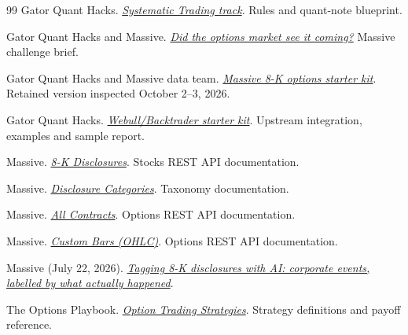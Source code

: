 \documentclass[11pt,letterpaper]{article}
\begin{document}
\clearpage
\begin{thebibliography}{99}
Gator Quant Hacks.
\href{https://www.gqhacks.com/tracks/systematic-trading}
{\emph{Systematic Trading track}}. Rules and quant-note blueprint.

Gator Quant Hacks and Massive.
\href{https://www.gqhacks.com/tracks/systematic-trading/massive}
{\emph{Did the options market see it coming?}} Massive challenge brief.

Gator Quant Hacks and Massive data team.
\href{https://www.gqhacks.com/massive/gqh-massive-8k-starter-kit.zip}
{\emph{Massive 8-K options starter kit}}.
Retained version inspected October 2--3, 2026.

Gator Quant Hacks.
\href{https://www.gqhacks.com/webull/gqh-webull-backtrader-starter.zip}
{\emph{Webull/Backtrader starter kit}}.
Upstream integration, examples and sample report.

Massive.
\href{https://massive.com/docs/rest/stocks/filings/8-k-disclosures}
{\emph{8-K Disclosures}}. Stocks REST API documentation.

Massive.
\href{https://massive.com/docs/rest/stocks/filings/disclosure-categories}
{\emph{Disclosure Categories}}. Taxonomy documentation.

Massive.
\href{https://massive.com/docs/rest/options/contracts/all-contracts}
{\emph{All Contracts}}. Options REST API documentation.

Massive.
\href{https://massive.com/docs/rest/options/aggregates/custom-bars}
{\emph{Custom Bars (OHLC)}}. Options REST API documentation.

Massive (July 22, 2026).
\href{https://www.massive.com/blog/tagging-8-k-disclosures-with-ai-corporate-events-labelled-by-what-actually-happened}
{\emph{Tagging 8-K disclosures with AI: corporate events, labelled by what actually happened}}.

The Options Playbook.
\href{https://www.optionsplaybook.com/option-strategies}
{\emph{Option Trading Strategies}}. Strategy definitions and payoff reference.


\end{thebibliography}
\end{document}
